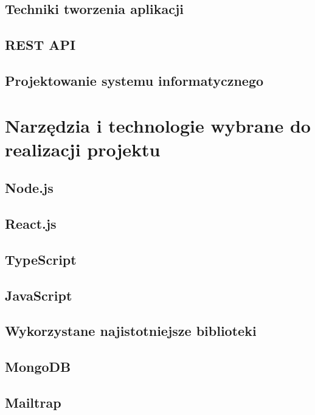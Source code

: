 \documentclass[12pt]{article}
\begin{document}
\begin{sloppypar}
{\subsection{Techniki tworzenia aplikacji}
{

}
\subsection{REST API}
{

}
\subsection{Projektowanie systemu informatycznego}
{

}
}

\section{Narzędzia i technologie wybrane do realizacji projektu}
{
\subsection{Node.js}
{

}
\subsection{React.js}
{

}
\subsection{TypeScript}
{

}
\subsection{JavaScript}
{

}
\subsection{Wykorzystane najistotniejsze biblioteki}
{

}
\subsection{MongoDB}
{

}
\subsection{Mailtrap}
{

}}
\end{sloppypar}
\end{document}
